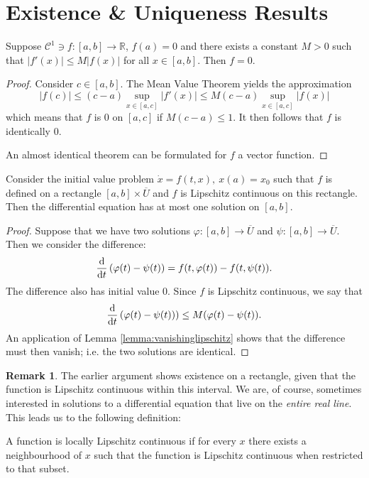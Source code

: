 \documentclass[prb,12pt]{revtex4-2}
\theoremstyle{definition}
\newtheorem{Remark}[Theorem]{Remark}
\theoremstyle{definition}
\theoremstyle{definition}
\newcommand{\R}{\mathbb{R}}
\begin{document}
	\section{Existence \& Uniqueness Results}
	\begin{Lemma}\label{lemma:vanishinglipschitz}
		Suppose $\mathcal{C}^1\ni f:[a,b]\to \R$, $f(a)=0$ and there exists a constant $M>0$ such that $|f'(x)|\le M |f(x)|$ for all $x\in [a,b]$. Then $f=0$.
	\end{Lemma}
	\begin{proof}
		Consider $c\in [a,b]$. The Mean Value Theorem yields the approximation
		\[|f(c)|\le (c-a)\sup_{x\in [a,c]}|f'(x)|\le M(c-a)\sup_{x\in [a,c]}|f(x)|\]
		which means that $f$ is $0$ on $[a,c]$ if $M(c-a)\le 1$. It then follows that $f$ is identically $0$.
		
		An almost identical theorem can be formulated for $f$ a vector function.
	\end{proof}
	\begin{Theorem}[Uniqueness]\label{thm:uniqueness}
		Consider the initial value problem $\dot{x}=f(t, x),~x(a)=x_0$ such that $f$ is defined on a rectangle $[a,b]\times \overline{U}$ and $f$ is Lipschitz continuous on this rectangle. Then the differential equation has at most one solution on $[a,b]$.
	\end{Theorem}
	\begin{proof}
		Suppose that we have two solutions $\varphi: [a,b] \to \overline{U}$ and $\psi: [a,b]\to \overline{U}$. Then we consider the difference:
		 \[\dv{t}\left(\varphi(t)-\psi(t)\right) = f(t, \varphi(t))-f(t,\psi(t)).\]
		 The difference also has initial value $0$. Since $f$ is Lipschitz continuous, we say that
		 \[\dv{t}\left( \varphi(t) - \psi(t)\right)) \le M(\varphi(t)-\psi(t)).\]
		 An application of Lemma \ref{lemma:vanishinglipschitz} shows that the difference must then vanish; i.e. the two solutions are identical.
	\end{proof}
	\begin{Remark}
		The earlier argument shows existence on a rectangle, given that the function is Lipschitz continuous within this interval. We are, of course, sometimes interested in solutions to a differential equation that live on the \emph{entire real line}. This leads us to the following definition:
	\end{Remark}
	\begin{Definition}
		A function is locally Lipschitz continuous if for every $x$ there exists a neighbourhood of $x$ such that the function is Lipschitz continuous when restricted to that subset.
	\end{Definition}
\end{document}
